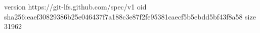 version https://git-lfs.github.com/spec/v1
oid sha256:eaef30829386b25e046437f7a188c3e87f2fe95381caecf5b5ebdd5bf43f8a58
size 31962
